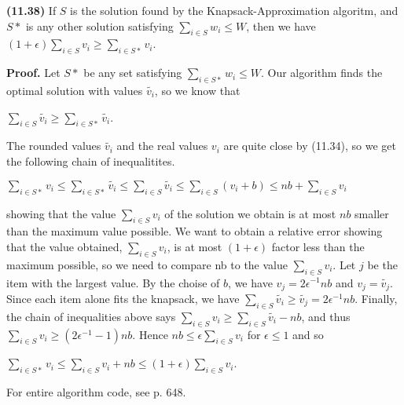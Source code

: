 \documentclass{proc}
\begin{document}
\begin{mdframed}
    \textbf{(11.38)} If $S$ is the solution found by the Knapsack-Approximation algoritm, and $S*$ is any other solution satisfying $\sum_{i \in S} w_i \le W$, then we have $(1 + \epsilon) \sum_{i \in S} v_i \ge \sum_{i \in S*} v_i$.
    
    \textbf{Proof.} Let $S*$ be any set satisfying $\sum_{i \in S*} w_i \le W$. Our algorithm finds the optimal solution with values $\tilde{v_i}$, so we know that
    
    $\sum_{i \in S} \tilde{v_i} \ge \sum_{i \in S*} \tilde{v_i}$.
    
    The rounded values $\tilde{v_i}$ and the real values $v_i$ are quite close by (11.34), so we get the following chain of inequalitites.
    
    $\sum_{i \in S*} v_i \le \sum_{i \in S*} \tilde{v_i} \le \sum_{i \in S} \tilde{v_i} \le \sum_{i \in S} (v_i + b) \le nb + \sum_{i \in S} v_i $
    
    showing that the value $\sum_{i \in S} v_i$ of the solution we obtain is at most $nb$ smaller than the maximum value possible. We want to obtain a relative error showing that the value obtained, $\sum_{i \in S} v_i$, is at most $(1 + \epsilon)$ factor less than the maximum possible, so we need to compare nb to the value $\sum_{i \in S} v_i$.
    Let $j$ be the item with the largest value. By the choise of $b$, we have $v_j = 2\epsilon^{-1}nb$ and $v_j = \tilde{v_j}$. Since each item alone fits the knapsack, we have $\sum_{i \in S} \tilde{v_i} \ge \tilde{v_j} = 2\epsilon^{-1}nb$. Finally, the chain of inequalities above says $\sum_{i \in S} v_i \ge \sum_{i \in S} \tilde{v_i} - nb$, and thus $\sum_{i \in S} v_i \ge (2\epsilon^{-1} - 1)nb$. Hence $nb \le \epsilon \sum_{i \in S} v_i$ for $\epsilon \le 1$ and so
    
    $\sum_{i \in S*} v_i \le \sum_{i \in S} v_i + nb \le (1 + \epsilon) \sum_{i \in S} v_i$.
\end{mdframed}

For entire algorithm code, see p. 648.
\end{document}
